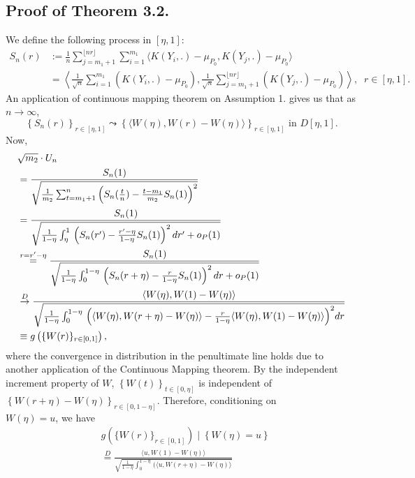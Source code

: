 \documentclass[11pt]{article}
\theoremstyle{plain}
\theoremstyle{definition}
\theoremstyle{remark}
\begin{document}
\begin{appendix}
\subsection{Proof of Theorem 3.2.}
We define the following process in $[\eta,1]$:
    \begin{align*}
        S_n(r)&:=\frac{1}{n}\sum_{j=m_1+1}^{\lfloor nr \rfloor}\sum_{i=1}^{m_1} \langle K(Y_i,.)-\mu_{P_0}, K(Y_j,.)-\mu_{P_0}\rangle\\       &=\left\langle \frac{1}{\sqrt{n}}\sum_{i=1}^{m_1}(K(Y_i,.)-\mu_{P_0}),  \frac{1}{\sqrt{n}}\sum_{j=m_1+1}^{\lfloor nr \rfloor}(K(Y_j,.)-\mu_{P_0})\right\rangle,\;\; r \in[\eta,1].
    \end{align*}
An application of continuous mapping theorem on Assumption 1. gives us that as $n \to \infty$,
    $$\left\{S_n(r)\right\}_{r \in [\eta,1]}\leadsto \left\{\langle W(\eta), W(r)-W(\eta)\rangle\right\}_{r \in [\eta,1]} \text{ in } D[\eta,1].$$
    Now,
\begin{align*}
  &\sqrt{m_2}\cdot U_n\\
  &=\frac{S_n(1)}{\sqrt{\frac{1}{m_2}\sum_{t=m_1+1}^n\left(S_n(\frac{t}{n})-\frac{t-m_1}{m_2}S_n(1)\right)^2}}\\
  &=\frac{S_n(1)}{\sqrt{\frac{1}{1-\eta}\int_{\eta}^{1}\,\left(S_n(r')-\frac{r'-\eta}{1-\eta}S_n(1)\right)^2 dr'+o_P(1)}}\\
  &\overset{r=r'-\eta}{=}\frac{S_n(1)}{\sqrt{\frac{1}{1-\eta}\int_{0}^{1-\eta}\,\left(S_n(r+\eta)-\frac{r}{1-\eta}S_n(1)\right)^2 dr+o_P(1)}}\allowdisplaybreaks
  \\
  &\overset{D}{\to}\frac{\langle W(\eta), W(1)-W(\eta)\rangle}{\sqrt{\frac{1}{1-\eta}\int_{0}^{1-\eta}\,\Big(\langle W(\eta), W(r+\eta)-W(\eta)\rangle
  -\frac{r}{1-\eta} \langle W(\eta), W(1)-W(\eta)\rangle\Big)^2 dr}}\\
  &\equiv g\left(\{W(r)\}_{r \in [0,1]}\right),
\end{align*}
where the convergence in distribution in the penultimate line holds due to another application of the Continuous Mapping theorem. By the independent increment property of $W$, $\left\{W(t)\right\}_{t \in [0,\eta]}$ is independent of $\left\{W(r+\eta)-W(\eta)\right\}_{r \in [0,1-\eta]}$. Therefore, conditioning on\\ $W(\eta)=u$, we have
\begin{align*}
    &g\left(\{W(r)\}_{r \in [0,1]}\right) \mid \left\{W(\eta)=u\right\}\\
    &\overset{D}{=}\frac{\langle u, W(1)-W(\eta)\rangle}{\sqrt{\frac{1}{1-\eta}\int_{0}^{1-\eta}\,\Big(\langle u, W(r+\eta)-W(\eta)\rangle
}}
\end{align*}
\end{appendix}
\end{document}

